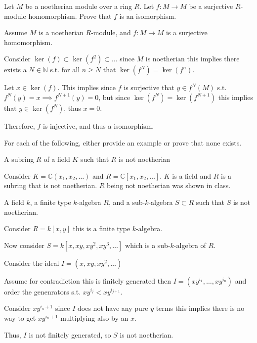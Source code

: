 \documentclass[12pt, letterpaper]{article}
\newcommand{\C}{\mathbb{C}}
\newcommand{\N}{\mathbb{N}}
\begin{document}
\begin{problem}{}
    Let $M$ be a noetherian module over a ring $R$. Let $f : M \to M$ be a surjective $R$-module
homomorphism. Prove that $f$ is an isomorphism.
\end{problem}
\begin{problemproof}
    Assume $M$ is a noetherian $R$-module, and $f : M \to M$ is a surjective homomorphism.

    Consider $\ker(f) \subset \ker(f^2) \subset \dots$ since $M$ is noetherian this implies there exists a $N \in \N$ s.t. for all $n \geq N$ that $\ker(f^N)=\ker(f^n)$.

    Let $x \in \ker(f)$. This implies since $f$ is surjective that $y \in f^N(M)$ s.t. $f^N(y)=x \implies f^{N+1}(y)=0$, but since $\ker(f^N)=\ker(f^{N+1})$ this implies that $y \in \ker(f^N)$, thus $x=0$.

    Therefore, $f$ is injective, and thus a isomorphism.
\end{problemproof}

\begin{problem}{}
    For each of the following, either provide an example or prove that none exists.
\end{problem}
\begin{subproblem}{}
    A subring $R$ of a field $K$ such that $R$ is not noetherian
\end{subproblem}
\begin{problemproof}
    Consider $K=\C(x_1,x_2,\dots)$ and $R=\C[x_1,x_2,\dots]$. $K$ is a field and $R$ is a subring that is not noetherian. $R$ being not noetherian was shown in class.
\end{problemproof}

\begin{subproblem}{}
    A field $k$, a finite type $k$-algebra $R$, and a sub-$k$-algebra $S \subset R$ such that $S$ is not
noetherian.
\end{subproblem}
\begin{problemproof}
    Consider $R=k[x,y]$ this is a finite type $k$-algebra. 
    
    Now consider $S=k[x,xy,xy^2,xy^3,\dots]$ which is a sub-$k$-algebra of $R$.

    Consider the ideal $I=(x,xy,xy^2,\dots)$

    Assume for contradiction this is finitely generated then $I=(xy^{i_1},\dots,xy^{i_n})$ and order the genenrators s.t. $xy^{i_j} < xy^{i_{j+1}}$.

    Consider $xy^{i_n + 1}$ since $I$ does not have any pure $y$ terms this implies there is no way to get $xy^{i_n + 1}$ multiplying also by an $x$.

    Thus, $I$ is not finitely generated, so $S$ is not noetherian.
\end{problemproof}
\end{document}
